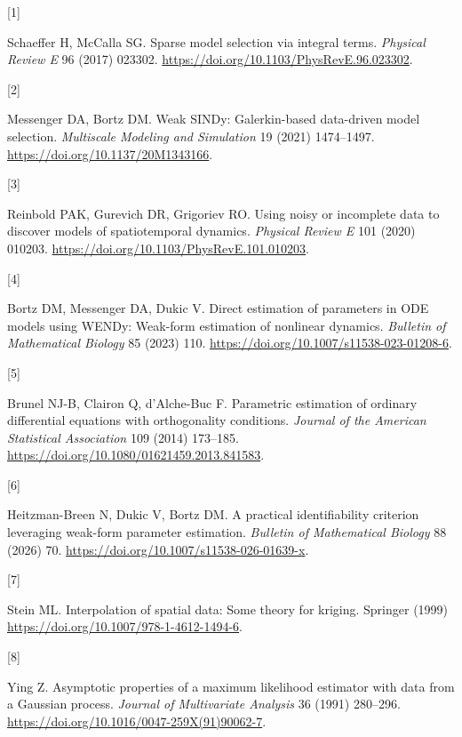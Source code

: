\documentclass[
  american,
  11pt,
]{article}
\newlength{\cslhangindent}
\newlength{\csllabelwidth}
\newenvironment{CSLReferences}[2] %
 {\begin{list}{}{%
  \setlength{\itemindent}{0pt}
  \setlength{\leftmargin}{0pt}
  \setlength{\parsep}{0pt}
  \ifodd #1
   \setlength{\leftmargin}{\cslhangindent}
   \setlength{\itemindent}{-1\cslhangindent}
  \fi
  \setlength{\itemsep}{#2\baselineskip}}}
 {\end{list}}
\newcommand{\CSLLeftMargin}[1]{\parbox[t]{\csllabelwidth}{\strut#1\strut}}
\newcommand{\CSLRightInline}[1]{\parbox[t]{\linewidth - \csllabelwidth}{\strut#1\strut}}
\begin{document}
\protect{}\label{refs}
\begin{CSLReferences}{0}{0}
\CSLLeftMargin{{[}1{]} }%
\CSLRightInline{Schaeffer H, McCalla SG. Sparse model selection via
integral terms. \emph{Physical Review E} 96 (2017) 023302.
\url{https://doi.org/10.1103/PhysRevE.96.023302}.}

\CSLLeftMargin{{[}2{]} }%
\CSLRightInline{Messenger DA, Bortz DM. Weak {SINDy}: Galerkin-based
data-driven model selection. \emph{Multiscale Modeling and Simulation}
19 (2021) 1474--1497. \url{https://doi.org/10.1137/20M1343166}.}

\CSLLeftMargin{{[}3{]} }%
\CSLRightInline{Reinbold PAK, Gurevich DR, Grigoriev RO. Using noisy or
incomplete data to discover models of spatiotemporal dynamics.
\emph{Physical Review E} 101 (2020) 010203.
\url{https://doi.org/10.1103/PhysRevE.101.010203}.}

\CSLLeftMargin{{[}4{]} }%
\CSLRightInline{Bortz DM, Messenger DA, Dukic V. Direct estimation of
parameters in {ODE} models using {WENDy}: Weak-form estimation of
nonlinear dynamics. \emph{Bulletin of Mathematical Biology} 85 (2023)
110. \url{https://doi.org/10.1007/s11538-023-01208-6}.}

\CSLLeftMargin{{[}5{]} }%
\CSLRightInline{{Brunel NJ-B, Clairon Q, d'Alche-Buc F}. Parametric
estimation of ordinary differential equations with orthogonality
conditions. \emph{Journal of the American Statistical Association} 109
(2014) 173--185. \url{https://doi.org/10.1080/01621459.2013.841583}.}

\CSLLeftMargin{{[}6{]} }%
\CSLRightInline{Heitzman-Breen N, Dukic V, Bortz DM. A practical
identifiability criterion leveraging weak-form parameter estimation.
\emph{Bulletin of Mathematical Biology} 88 (2026) 70.
\url{https://doi.org/10.1007/s11538-026-01639-x}.}

\CSLLeftMargin{{[}7{]} }%
\CSLRightInline{Stein ML. Interpolation of spatial data: Some theory for
kriging. Springer (1999)
\url{https://doi.org/10.1007/978-1-4612-1494-6}.}

\CSLLeftMargin{{[}8{]} }%
\CSLRightInline{Ying Z. Asymptotic properties of a maximum likelihood
estimator with data from a {G}aussian process. \emph{Journal of
Multivariate Analysis} 36 (1991) 280--296.
\url{https://doi.org/10.1016/0047-259X(91)90062-7}.}


\end{CSLReferences}
\end{document}
